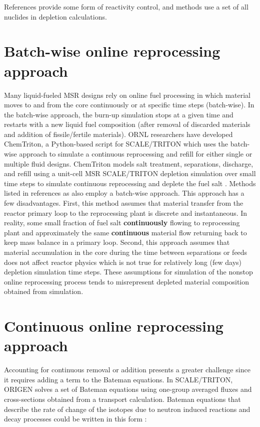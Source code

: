 References \cite{li_optimization_2018,de_troullioud_de_lanversin_toward_2017,doligez_coupled_2014,
heuer_towards_2014, sheu_depletion_2013, aufiero_extended_2013} provide some form of reactivity control, 
and methods \cite{doligez_coupled_2014,heuer_towards_2014,aufiero_extended_2013,ahmad_neutronics_2015, 
park_whole_2015,jeong_equilibrium_2016,rykhlevskii_modeling_2019,nuttin_potential_2005} use a set of all nuclides in depletion calculations. 

\section{Batch-wise online reprocessing approach}
Many liquid-fueled \gls{MSR} designs rely on online fuel processing in which  
material moves to and from the core continuously or at specific time steps 
(batch-wise). In the batch-wise approach, the burn-up simulation stops at a given 
time and restarts with a new liquid fuel composition (after removal of discarded 
materials and addition of fissile/fertile materials). \gls{ORNL} researchers 
have developed ChemTriton, a Python-based script for SCALE/TRITON which uses the 
batch-wise approach to simulate a continuous reprocessing and refill for either single 
or multiple fluid designs. ChemTriton models salt 
treatment, separations, discharge, and refill using a unit-cell \gls{MSR} 
SCALE/TRITON depletion simulation over small time steps to simulate continuous 
reprocessing and deplete the fuel salt \cite{powers_new_2013}. Methods listed in 
references \cite{zhou_fuel_2018-1,sheu_depletion_2013,park_whole_2015,jeong_equilibrium_2016, powers_inventory_2014,betzler_molten_2017,rykhlevskii_modeling_2019} 
as also employ a batch-wise approach. This approach has a few disadvantages. First, 
this method assumes that material transfer from the reactor primary loop to the reprocessing 
plant is discrete and instantaneous. In reality, some small fraction of fuel salt \textbf{continuously} flowing to reprocessing plant and approximately the same 
\textbf{continuous} material flow returning back to keep mass balance in a 
primary loop. Second, this approach assumes that material accumulation in the core 
during the time between separations or feeds does not affect reactor physics which 
is not true for relatively long (few days) depletion simulation time steps. These assumptions for simulation of the nonstop online reprocessing process tends to
 misrepresent depleted material composition obtained from simulation.

\section{Continuous online reprocessing approach}
Accounting for continuous removal or addition presents a greater challenge since it 
requires adding a term to the Bateman equations. In SCALE/TRITON, ORIGEN \cite{gauld_isotopic_2011} solves a set of Bateman equations using one-group averaged fluxes and cross-sections obtained from a transport calculation. Bateman equations that describe the rate of change of the isotopes due to neutron induced reactions and decay
processes could be written in this form \cite{aufiero_extended_2013}:

